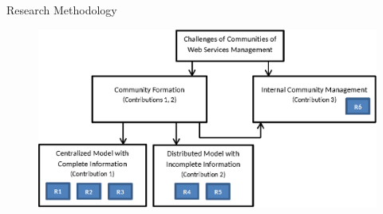 \documentclass{beamer}
\begin{document}
\begin{frame}{Research Methodology}
    \begin{figure}[htbp]
        \centering
        \includegraphics[width=0.9 \columnwidth]{figures/model.eps}
    \end{figure}
\end{frame}




\end{document}
